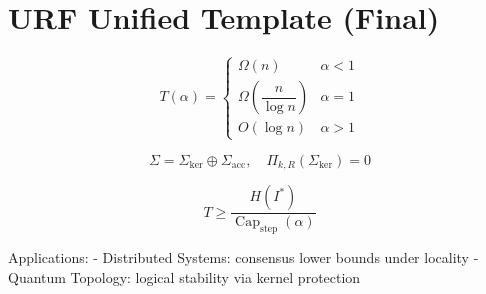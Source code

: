\section*{URF Unified Template (Final)}

\[
T(\alpha) =
\begin{cases}
\Omega(n) & \alpha < 1 \\
\Omega\!\left(\dfrac{n}{\log n}\right) & \alpha = 1 \\
O(\log n) & \alpha > 1
\end{cases}
\]

\[
\Sigma = \Sigma_{\mathrm{ker}} \oplus \Sigma_{\mathrm{acc}},\quad
\Pi_{k,R}(\Sigma_{\mathrm{ker}})=0
\]

\[
T \ge \frac{H(I^\ast)}{\operatorname{Cap}_{\mathrm{step}}(\alpha)}
\]

Applications:
- Distributed Systems: consensus lower bounds under locality
- Quantum Topology: logical stability via kernel protection
